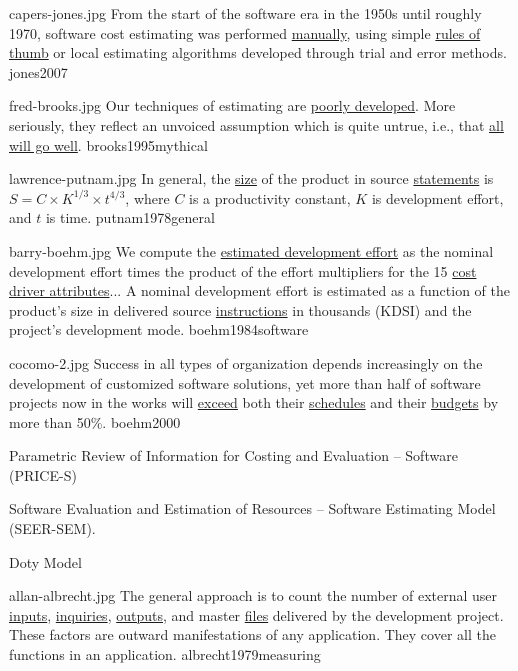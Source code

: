 \documentclass{article}
\begin{document}

\qte
  {capers-jones.jpg}
  {From the start of the software era in the 1950s until roughly 1970, software cost estimating was performed \ul{manually}, using simple \ul{rules of thumb} or local estimating algorithms developed through trial and error methods.}
  {jones2007}

\qte
  {fred-brooks.jpg}
  {Our techniques of estimating are \ul{poorly developed}. More seriously, they reflect an unvoiced assumption which is quite untrue, i.e., that \ul{all will go well}.}
  {brooks1995mythical}

\qte
  {lawrence-putnam.jpg}
  {In general, the \ul{size} of the product in source \ul{statements} is \(S = C \times K^{1/3} \times t^{4/3}\), where \(C\) is a productivity constant, \(K\) is development effort, and \(t\) is time.}
  {putnam1978general}

\qte
  {barry-boehm.jpg}
  {We compute the \ul{estimated development effort} as the nominal development effort times the product of the effort multipliers for the 15 \ul{cost driver attributes}... A nominal development effort is estimated as a function of the product's size in delivered source \ul{instructions} in thousands (KDSI) and the project's development mode.}
  {boehm1984software}

\qte
  {cocomo-2.jpg}
  {Success in all types of organization depends increasingly on the development of customized software solutions, yet more than half of software projects now in the works will \ul{exceed} both their \ul{schedules} and their \ul{budgets} by more than 50\%.}
  {boehm2000}

Parametric Review of Information for Costing and Evaluation – Software (PRICE-S)

Software Evaluation and Estimation of Resources – Software Estimating Model (SEER-SEM).

Doty Model

\qte
  {allan-albrecht.jpg}
  {The general approach is to count the number of external user \ul{inputs}, \ul{inquiries}, \ul{outputs}, and master \ul{files} delivered by the development project. These factors are outward manifestations of any application. They cover all the functions in an application.}
  {albrecht1979measuring}
\end{document}
